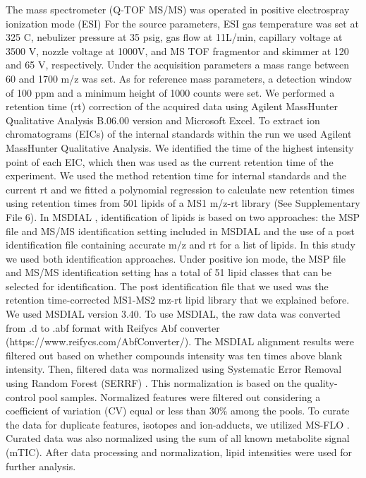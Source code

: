 \documentclass[9pt,twocolumn,twoside,lineno]{BioRxiv}
\begin{document}
The mass spectrometer (Q-TOF MS/MS) was operated in positive electrospray ionization mode (ESI)
For the source parameters, ESI gas temperature was set at 325 \degree C, nebulizer pressure at 35 psig, gas flow at 11L/min, capillary voltage at 3500 V, nozzle voltage at 1000V, and MS TOF fragmentor and skimmer at 120 and 65 V, respectively.
Under the acquisition parameters a mass range between 60 and 1700 m/z was set. 
As for reference mass parameters, a detection window of 100 ppm and a minimum height of 1000 counts were set. 
We performed a retention time (rt) correction of the acquired data using Agilent MassHunter Qualitative Analysis B.06.00 version and Microsoft Excel. 
To extract ion chromatograms (EICs) of the internal standards within the run we used Agilent MassHunter Qualitative Analysis.
We identified the time of the highest intensity point of each EIC, which then was used as the current retention time of the experiment. 
We used the method retention time for internal standards and the current rt and we fitted a polynomial regression to calculate new retention times using retention times from 501 lipids of a MS1 m/z-rt library (See Supplementary File 6). 
In MSDIAL \cite{Tsugawa2015-kh}, identification of lipids is based on two approaches: the MSP file and MS/MS identification setting included in MSDIAL and the use of a post identification file containing accurate m/z and rt for a list of lipids. 
In this study we used both identification approaches. 
Under positive ion mode, the MSP file and MS/MS identification setting has a total of 51 lipid classes  that can be selected for identification. 
The post identification file that we used was the retention time-corrected MS1-MS2 mz-rt lipid library that we explained before. 
We used MSDIAL \cite{Tsugawa2015-kh} version 3.40. 
To use MSDIAL, the raw data was converted from .d to .abf format with Reifycs Abf converter (https://www.reifycs.com/AbfConverter/). 
The MSDIAL alignment results were filtered out based on whether compounds intensity was ten times above blank intensity. 
Then, filtered data was normalized using Systematic Error Removal using Random Forest (SERRF) \cite{Fan2019}.
This normalization is based on the quality-control pool samples. 
Normalized features were filtered out considering a coefficient of variation (CV) equal or less than 30\% among the pools. 
To curate the data for duplicate features, isotopes and ion-adducts, we utilized MS-FLO \cite{DeFelice2017-ms}.
Curated data was also normalized using the sum of all known metabolite signal (mTIC). 
After data processing and normalization, lipid intensities were used for further analysis.
\end{document}
